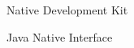 \suppressfloats[t]

\begin{description}[\setleftmargin{65pt}\setlabelstyle{\bfseries}]
    \leftskip=1cm

    \item[$NDK$]      	Native Development Kit
    \item[$JNI$]      	Java Native Interface
\end{description}
